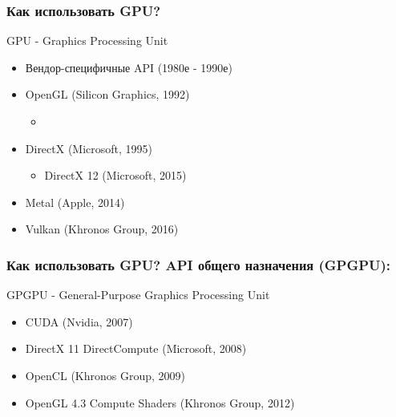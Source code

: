 \documentclass{beamer}
\begin{document}
\begin{frame}[label=api]
\frametitle{Как использовать GPU? }
GPU - Graphics Processing Unit
\pause
\pause
\begin{itemize}
\item Вендор-специфичные API (1980е - 1990е)
\pause
\item OpenGL (Silicon Graphics, 1992)
\pause
\begin{itemize}
\item {}
\end{itemize}
\pause
\item DirectX (Microsoft, 1995)
\pause
\begin{itemize}
\item {DirectX 12 (Microsoft, 2015)}
\end{itemize}
\pause
\item {\only<10->{\color{red}}Metal (Apple, 2014)}
\pause
\item {Vulkan (Khronos Group, 2016)}
\end{itemize}
\end{frame}

\begin{frame}[label=api]
\frametitle{Как использовать GPU? API общего назначения (GPGPU):}
GPGPU - General-Purpose Graphics Processing Unit
\pause
\begin{itemize}
\item CUDA (Nvidia, 2007)
\pause
\item DirectX 11 DirectCompute (Microsoft, 2008)
\pause
\item OpenCL (Khronos Group, 2009)
\pause
\item OpenGL 4.3 Compute Shaders (Khronos Group, 2012)
\end{itemize}
\end{frame}




\end{document}
